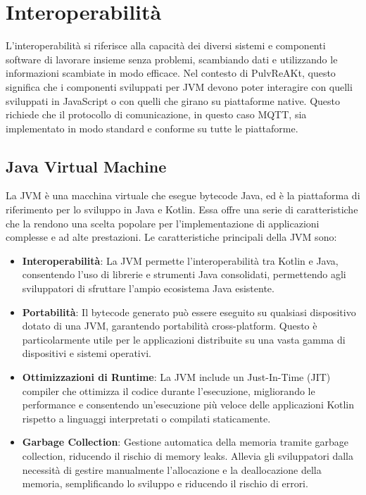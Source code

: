 \documentclass[12pt,a4paper,openright,twoside]{book}
\begin{document}
\section{Interoperabilità}

L'interoperabilità si riferisce alla capacità dei diversi sistemi e componenti software di lavorare insieme senza problemi, scambiando dati e utilizzando le informazioni scambiate 
in modo efficace. Nel contesto di PulvReAKt, questo significa che i componenti sviluppati per \ac{JVM} devono poter interagire con quelli sviluppati in JavaScript o con quelli 
che girano su piattaforme native. Questo richiede che il protocollo di comunicazione, in questo caso \ac{MQTT}, sia implementato in modo standard e conforme su tutte le piattaforme.
\subsection{Java Virtual Machine}

La \ac{JVM} è una macchina virtuale che esegue bytecode Java, ed è la piattaforma di riferimento per lo sviluppo in Java e Kotlin. 
Essa offre una serie di caratteristiche che la rendono una scelta popolare per l'implementazione di applicazioni complesse e ad alte prestazioni.
Le caratteristiche principali della \ac{JVM} sono:

\begin{itemize}
\item \textbf{Interoperabilità}: La \ac{JVM} permette l'interoperabilità tra Kotlin e Java, consentendo l'uso di librerie e strumenti Java consolidati, 
 permettendo agli sviluppatori di sfruttare l'ampio ecosistema Java esistente.
\item \textbf{Portabilità}: Il bytecode generato può essere eseguito su qualsiasi dispositivo dotato di una \ac{JVM}, garantendo portabilità cross-platform. 
Questo è particolarmente utile per le applicazioni distribuite su una vasta gamma di dispositivi e sistemi operativi.
\item \textbf{Ottimizzazioni di Runtime}: La \ac{JVM} include un Just-In-Time (JIT) compiler che ottimizza il codice durante l'esecuzione, migliorando le performance e 
consentendo un'esecuzione più veloce delle applicazioni Kotlin rispetto a linguaggi interpretati o compilati staticamente.
\item \textbf{Garbage Collection}: Gestione automatica della memoria tramite garbage collection, riducendo il rischio di memory leaks. 
Allevia gli sviluppatori dalla necessità di gestire manualmente l'allocazione e la deallocazione della memoria, semplificando lo sviluppo e riducendo il rischio di errori.
\end{itemize}
\end{document}
